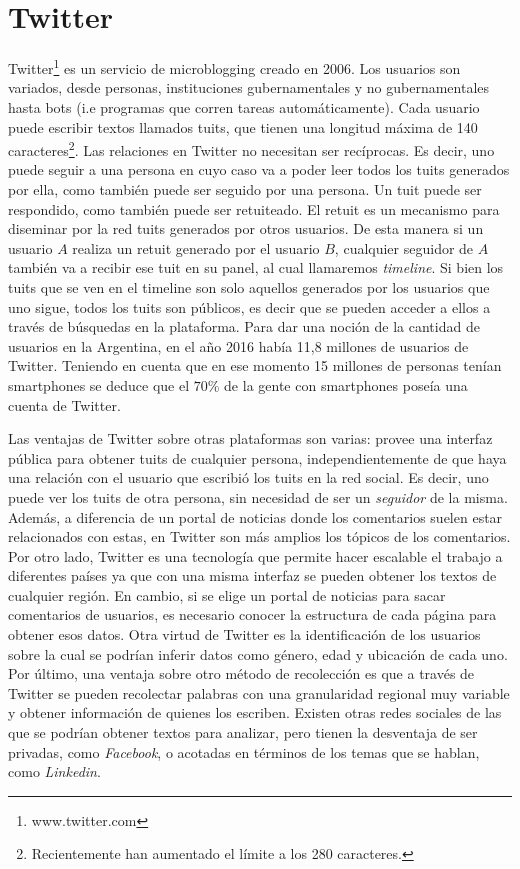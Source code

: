 \section{Twitter}
Twitter\footnote{www.twitter.com} es un servicio de microblogging creado en 2006. Los usuarios son variados, desde personas, instituciones gubernamentales y no gubernamentales hasta bots (i.e programas que corren tareas automáticamente). Cada usuario puede escribir textos llamados tuits, que tienen una longitud máxima de 140 caracteres\footnote{Recientemente han aumentado el límite a los 280 caracteres.}. Las relaciones en Twitter no necesitan ser recíprocas. Es decir, uno puede seguir a una persona en cuyo caso va a poder leer todos los tuits generados por ella, como también puede ser seguido por una persona. Un tuit puede ser respondido, como también puede ser retuiteado. El retuit es un mecanismo para diseminar por la red tuits generados por otros usuarios. De esta manera si un usuario $A$ realiza un retuit generado por el usuario $B$, cualquier seguidor de $A$ también va a recibir ese tuit en su panel, al cual llamaremos \textit{timeline}. Si bien los tuits que se ven en el timeline son solo aquellos generados por los usuarios que uno sigue, todos los tuits son públicos, es decir que se pueden acceder a ellos a través de búsquedas en la plataforma.
Para dar una noción de la cantidad de usuarios en la Argentina, en el año 2016 había 11,8 millones de usuarios de Twitter. Teniendo en cuenta que en ese momento 15 millones de personas tenían smartphones se deduce que el $70$\% de la gente con smartphones poseía una cuenta de Twitter.%

Las ventajas de Twitter sobre otras plataformas son varias: provee una interfaz pública para obtener tuits de cualquier persona, independientemente de que haya una relación con el usuario que escribió los tuits en la red social. Es decir, uno puede ver los tuits de otra persona, sin necesidad de ser un \textit{seguidor} de la misma. Además, a diferencia de un portal de noticias donde los comentarios suelen estar relacionados con estas, en Twitter son más amplios los tópicos de los comentarios.
Por otro lado, Twitter es una tecnología que permite hacer escalable el trabajo a diferentes países ya que con una misma interfaz se pueden obtener los textos de cualquier región. En cambio, si se elige un portal de noticias para sacar comentarios de usuarios, es necesario conocer la estructura de cada página para obtener esos datos.
Otra virtud de Twitter es la identificación de los usuarios sobre la cual se podrían inferir datos como género, edad y ubicación de cada uno.
Por último, una ventaja sobre otro método de recolección es que a través de Twitter se pueden recolectar palabras con una granularidad regional muy variable y obtener información de quienes los escriben.
Existen otras redes sociales de las que se podrían obtener textos para analizar, pero tienen la desventaja de ser privadas, como \textit{Facebook}, o acotadas en términos de los temas que se hablan, como \textit{Linkedin}. 

